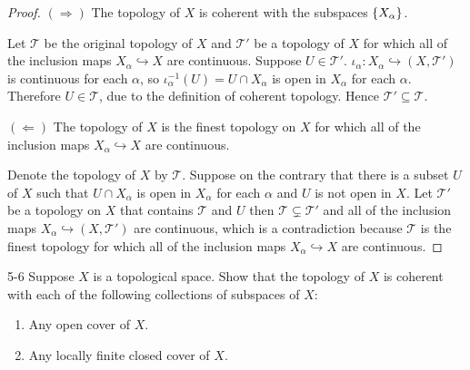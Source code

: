\begin{proof}
	$(\Longrightarrow)$ The topology of $X$ is coherent with the subspaces $\left\{{X_{\alpha}}\right\}$.

	Let $\mathscr{T}$ be the original topology of $X$ and $\mathscr{T}'$ be a topology of $X$ for which all of the inclusion maps $X_{\alpha} \hookrightarrow{} X$ are continuous. Suppose $U \in \mathscr{T}'$. $\iota_{\alpha}: X_{\alpha} \hookrightarrow{} (X, \mathscr{T}')$ is continuous for each $\alpha$, so $\iota_{\alpha}^{-1}(U) = U \cap X_{\alpha}$ is open in $X_{\alpha}$ for each $\alpha$. Therefore $U \in \mathscr{T}$, due to the definition of coherent topology. Hence $\mathscr{T}' \subseteq \mathscr{T}$.

	$(\Longleftarrow)$ The topology of $X$ is the finest topology on $X$ for which all of the inclusion maps $X_{\alpha} \hookrightarrow{} X$ are continuous.

	Denote the topology of $X$ by $\mathscr{T}$. Suppose on the contrary that there is a subset $U$ of $X$ such that $U\cap X_{\alpha}$ is open in $X_{\alpha}$ for each $\alpha$ and $U$ is not open in $X$. Let $\mathscr{T}'$ be a topology on $X$ that contains $\mathscr{T}$ and $U$ then $\mathscr{T} \subsetneq \mathscr{T}'$ and all of the inclusion maps $X_{\alpha} \hookrightarrow{} (X, \mathscr{T}')$ are continuous, which is a contradiction because $\mathscr{T}$ is the finest topology for which all of the inclusion maps $X_{\alpha} \hookrightarrow{} X$ are continuous.
\end{proof}

\begin{problem}{5-6}\label{problem:5-6}
Suppose $X$ is a topological space. Show that the topology of $X$ is coherent with each of the following collections of subspaces of $X$:
\begin{enumerate}[label={(\alph*)}]
	\item Any open cover of $X$.
	\item Any locally finite closed cover of $X$.
\end{enumerate}
\end{problem}

